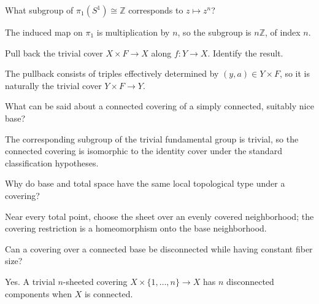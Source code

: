 \begin{problem}\label{prob:viii10-16}
What subgroup of \(\pi_1(S^1)\cong\mathbb Z\) corresponds to \(z\mapsto z^n\)?
\end{problem}
\begin{solution}
The induced map on \(\pi_1\) is multiplication by \(n\), so the subgroup is \(n\mathbb Z\), of index \(n\).
\end{solution}

\begin{problem}\label{prob:viii10-17}
Pull back the trivial cover \(X\times F\to X\) along \(f:Y\to X\). Identify the result.
\end{problem}
\begin{solution}
The pullback consists of triples effectively determined by \((y,a)\in Y\times F\), so it is naturally the trivial cover \(Y\times F\to Y\).
\end{solution}

\begin{problem}\label{prob:viii10-18}
What can be said about a connected covering of a simply connected, suitably nice base?
\end{problem}
\begin{solution}
The corresponding subgroup of the trivial fundamental group is trivial, so the connected covering is isomorphic to the identity cover under the standard classification hypotheses.
\end{solution}

\begin{problem}\label{prob:viii10-19}
Why do base and total space have the same local topological type under a covering?
\end{problem}
\begin{solution}
Near every total point, choose the sheet over an evenly covered neighborhood; the covering restriction is a homeomorphism onto the base neighborhood.
\end{solution}

\begin{problem}\label{prob:viii10-20}
Can a covering over a connected base be disconnected while having constant fiber size?
\end{problem}
\begin{solution}
Yes.  A trivial \(n\)-sheeted covering \(X\times\{1,\dots,n\}\to X\) has \(n\) disconnected components when \(X\) is connected.
\end{solution}

